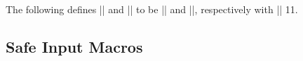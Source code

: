 \begin{multicols}
    \begin{teX}
    \deadcycles\z@
  \fi
  \let\@auxout\@mainaux}
    \end{teX}



 \begin{macro}{\@writeckpt}
 \end{macro}
    \begin{teX}
\def\@writeckpt#1{%
  \if@filesw
    \immediate\write\@partaux{\string\@setckpt{#1}\@charlb}%
    {\let\@elt\@wckptelt \cl@@ckpt}%
    \immediate\write\@partaux{\@charrb}%
  \fi}
    \end{teX}


 \begin{macro}{\@wckptelt}
 \end{macro}
    \begin{teX}
\def\@wckptelt#1{%
  \immediate\write\@partaux{%
    \string\setcounter{#1}{\the\@nameuse{c@#1}}}}
    \end{teX}


 \begin{macro}{\@setckpt}
 \end{macro}
    \begin{teX}
\def\@setckpt#1{\global\@namedef{cp@#1}}
    \end{teX}


 \begin{macro}{\@charlb}
 \begin{macro}{\@charrb}
 \end{macro}
 \end{macro}
 The following defines |\@charlb| and |\@charrb| to be |{| and |}|,
 respectively with |\catcode| 11.
    \begin{teX}
{\catcode`[=1 \catcode`]=2
\catcode`{=11 \catcode`}=11
\gdef\@charlb[{]
\gdef\@charrb[}]
]%
    \end{teX}


 \subsection{Safe Input Macros}

 \begin{macro}{\IfFileExists}
 \end{macro}

 \begin{teX}
\long{}
 \end{teX}



\end{multicols}
